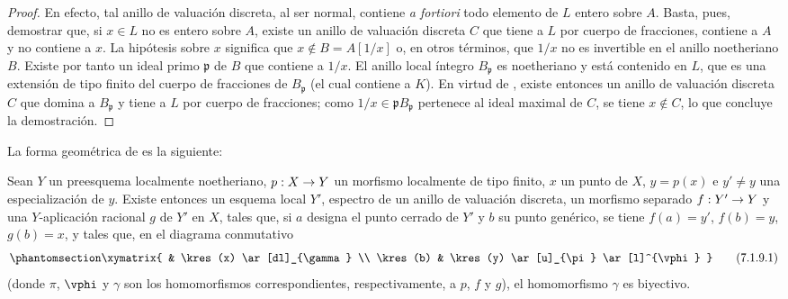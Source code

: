 \documentclass[oneside,10pt]{amsart}
\makeatletter
\newcommand{\ega@arrow}[2]{\mathchoice{#1}{#2}{#2}{#2}}
\renewcommand{\to}{\ega@arrow{\longrightarrow}{\rightarrow}}
\newcommand{\oldpage}[2][]{\marginnote{\normalfont\footnotesize\textbf{#1}~|~#2}\ignorespaces}
\let\EGAOriginalLabel\label
\renewcommand{\label}[1]{\phantomsection\EGAOriginalLabel{#1}}
\makeatother
\begin{document}
\begin{proof}
En efecto, tal anillo de valuación discreta, al ser normal, contiene \emph{a fortiori} todo elemento de $L$ entero sobre $A$.
Basta, pues, demostrar que, si $x\in L$ no es entero sobre $A$, existe un anillo de valuación discreta $C$ que tiene a $L$ por cuerpo de fracciones, contiene a $A$ y no contiene a $x$.
La hipótesis sobre $x$ significa que $x\notin B=A[1/x]$ o, en otros términos, que $1/x$ no es invertible en el anillo noetheriano $B$.
Existe por tanto un ideal primo $\mathfrak{p}$ de $B$ que contiene a $1/x$.
El anillo local íntegro $B_\mathfrak{p}$ es noetheriano y está contenido en $L$, que es una extensión de tipo finito del cuerpo de fracciones de $B_\mathfrak{p}$ (el cual contiene a $K$).
En virtud de , existe entonces un anillo de valuación discreta $C$ que domina a $B_\mathfrak{p}$ y tiene a $L$ por cuerpo de fracciones;
como $1/x\in\mathfrak{p}B_\mathfrak{p}$ pertenece al ideal maximal de $C$, se tiene $x\notin C$, lo que concluye la demostración.
\end{proof}

La forma geométrica de  es la siguiente:


\oldpage[II]{141}
\begin{proposition}[7.1.9]
\label{II.7.1.9}
Sean $Y$ un preesquema localmente noetheriano, $p:X\to Y$ un morfismo localmente de tipo finito, $x$ un punto de $X$, $y=p(x)$ e $y'\neq y$ una especialización de $y$.
Existe entonces un esquema local $Y'$, espectro de un anillo de valuación discreta, un morfismo separado $f:Y'\to Y$ y una $Y$-aplicación racional $g$ de $Y'$ en $X$, tales que, si $a$ designa el punto cerrado de $Y'$ y $b$ su punto genérico, se tiene $f(a)=y'$, $f(b)=y$, $g(b)=x$, y tales que, en el diagrama conmutativo
\[
\label{II.7.1.9.1}
  \xymatrix{
      & \kres(x) \ar[dl]_{\gamma}
  \\  \kres(b)
      & \kres(y) \ar[u]_{\pi} \ar[l]^{\vphi}
  }
\tag{7.1.9.1}
\]
(donde $\pi$, $\vphi$ y $\gamma$ son los homomorfismos correspondientes, respectivamente, a $p$, $f$ y $g$), el homomorfismo $\gamma$ es biyectivo.
\end{proposition}
\end{document}
